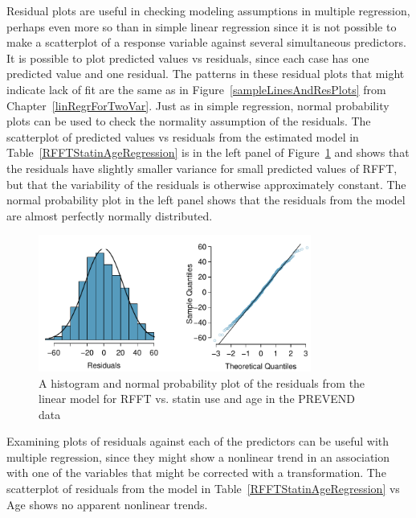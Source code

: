 Residual plots are useful in checking modeling assumptions in multiple regression, perhaps even more so than in simple linear regression since it is not possible to make a scatterplot of a response variable against several simultaneous predictors.  It is possible to plot predicted values vs residuals, since each case has one predicted value and one residual. The patterns in these residual plots that might indicate lack of fit are the same as in Figure~\ref{sampleLinesAndResPlots} from Chapter~\ref{linRegrForTwoVar}. Just as in simple regression, normal probability plots can be used to check the normality assumption of the residuals.  The scatterplot of predicted values vs residuals from the estimated model in Table~\ref{RFFTStatinAgeRegression} is in the left panel of Figure~\ref{statinAgeResidNormPlot} and shows that the residuals have slightly smaller variance for small predicted values of RFFT, but that the variability of the residuals is otherwise approximately constant.  The normal probability plot in the left panel shows that the residuals from the model are almost perfectly normally distributed.


\begin{figure}[h!]
	\centering
	\includegraphics[width=0.8\textwidth]
	{ch_multiple_linear_regression_oi_biostat/figures/statinAgeResidNormPlot/statinAgeResidNormPlot.pdf}
	\caption{A histogram and normal probability plot of the residuals from the linear model for RFFT vs. statin use and age in the PREVEND data}
	\label{statinAgeResidNormPlot}
\end{figure}


Examining plots of residuals against each of the predictors can be useful with multiple regression, since they might show a nonlinear trend in an association with one of the variables that might be corrected with a transformation.  The scatterplot of residuals from the model in Table~\ref{RFFTStatinAgeRegression} vs Age shows no apparent nonlinear trends.  


